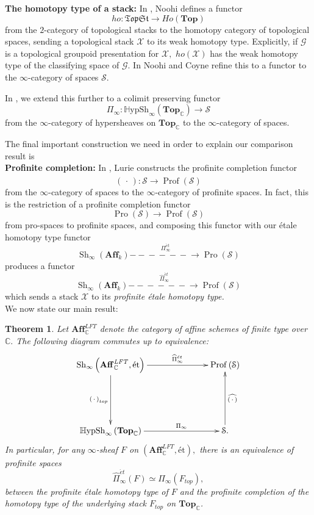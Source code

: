 \documentclass[12pt]{amsart}
\newtheorem{theorem}[dummy]{Theorem}
\theoremstyle{definition}
\newcommand{\bC}{\mathbb{C}}
\newcommand{\cG}{\mathcal{G}}
\newcommand{\cS}{\mathcal{S}}
\newcommand{\cX}{\mathcal{X}}
\newcommand{\Aff}{\mathbf{Aff}^{\mathit{LFT}}_{\mathbb{C}}}
\newcommand{\TopC}{\Top_\mathbb{C}}
\newcommand{\Sh}{\operatorname{Sh}}
\newcommand{\et}{\acute{e}t}
\def\Top{\mathbf{Top}}
\renewcommand{\i}{\infty}
\def\Pro{\operatorname{Pro}}
\def\Shi{\Sh_\i}
\def\Hshi{\mathbb{H}\mathrm{ypSh}_\i}
\def\blank{\mspace{3mu}\cdot\mspace{3mu}}
\def\Profs{\operatorname{Prof}\left(\cS\right)}
\def\Prof{\operatorname{Prof}}
\def\Top{\mathbf{Top}}
\def\longlongrightarrow{-\!\!\!-\!\!\!-\!\!\!-\!\!\!-\!\!\!-\!\!\!\longrightarrow}
\begin{document}
\textbf{The homotopy type of a stack:}
In \cite{No2}, Noohi defines a functor
$$ho:\mathfrak{TopSt} \to Ho\left(\Top\right)$$
from the $2$-category of topological stacks to the homotopy category of topological spaces, sending a topological stack $\cX$ to its weak homotopy type. Explicitly, if $\cG$ is a topological groupoid presentation for $\cX,$ $ho\left(\cX\right)$ has the weak homotopy type of the classifying space of $\cG.$ In \cite{No3} Noohi and Coyne refine this to a functor to the $\i$-category of spaces $\cS.$

In \cite{knhom}, we extend this further to a colimit preserving functor
$$\Pi_\i:\Hshi\left(\TopC\right) \to \cS$$ from the $\i$-category of hypersheaves on $\TopC$ to the $\i$-category of spaces.

The final important construction we need in order to explain our comparison result is\\

\textbf{Profinite completion:}
In \cite{dagxiii}, Lurie constructs the profinite completion functor
$$\widehat{\left(\blank\right)}:\cS \to \Prof\left(\cS\right)$$
from the $\i$-category of spaces to the $\i$-category of profinite spaces. In fact, this is the restriction of a profinite completion functor $$\Pro\left(\cS\right) \to \Prof\left(\cS\right)$$ from pro-spaces to profinite spaces, and composing this functor with our \'etale homotopy type functor $$\Shi\left(\mathbf{Aff}_k\right) \stackrel{\Pi^{\et}_\i}{\longlongrightarrow} \Pro\left(\cS\right)$$ produces a functor
$$\Shi\left(\mathbf{Aff}_k\right) \stackrel{\widehat{\Pi}^{\et}_\i}{\longlongrightarrow} \Prof\left(\cS\right)$$ which sends a stack $\cX$ to its \emph{profinite \'etale homotopy type.}\\

We now state our main result:\\

\begin{theorem}\label{thm: main intro}
Let $\Aff$ denote the category of affine schemes of finite type over $\bC.$ The following diagram commutes up to equivalence:
$$\xymatrix@C=2.5cm@R=2cm{\Shi\left(\Aff,\mbox{\'et}\right) \ar[r]^-{\widehat{\Pi}^{\et}_\i} \ar[d]_-{\left(\blank\right)_{top}} & \Profs\\
\Hshi\left(\TopC\right) \ar[r]^-{\Pi_\i} & \cS. \ar[u]_-{\widehat{\left(\blank\right)}}}$$
In particular, for any $\i$-sheaf $F$ on $\left(\Aff,\mbox{\'et}\right),$ there is an equivalence of profinite spaces $$\widehat{\Pi}^{\et}_\i\left(F\right) \simeq \widehat{\Pi}_\i\left(F_{top}\right),$$ between the profinite \'etale homotopy type of $F$ and the profinite completion of the homotopy type of the underlying stack $F_{top}$ on $\TopC$.
\end{theorem}
\end{document}
